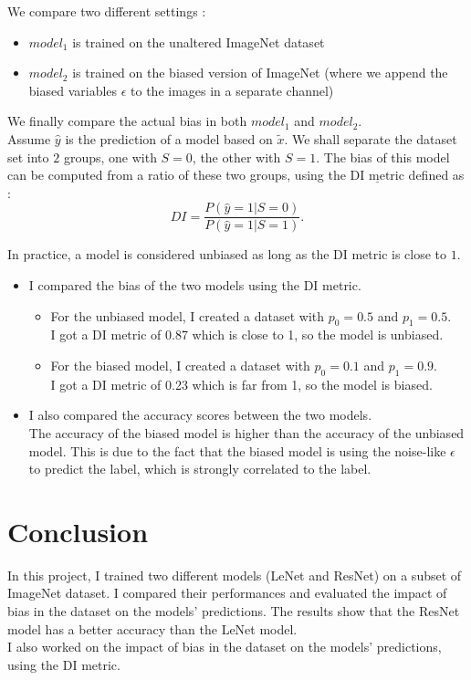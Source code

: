 \documentclass[12pt,a4paper]{article}
\begin{document}
We compare two different settings :
\begin{itemize}[label=--]
    \item $\textit{model}_1$ is trained on the unaltered ImageNet dataset
    \item $\textit{model}_2$ is trained on the biased version of ImageNet (where we append the biased variables $\epsilon$ to the images in a separate channel)
\end{itemize}


We finally compare the actual bias in both $\textit{model}_1$ and $\textit{model}_2$.\\

Assume $\hat{y}$ is the prediction of a model based on $\tilde{x}$.
We shall separate the dataset set into $2$ groups, one with $S = 0$, the other with $S = 1$.
The bias of this model can be computed from a ratio of these two groups, using the $\underline{\text{DI metric}}$ defined as :
$$
DI = \frac{P(\hat{y} = 1 | S = 0)}{P(\hat{y} = 1 | S = 1)}.
$$

In practice, a model is considered unbiased as long as the DI metric is close to $1$.


\begin{itemize}
    \item I compared the bias of the two models using the DI metric.
    \begin{itemize}[label=-]
        \item For the unbiased model, I created a dataset with $p_0 = 0.5$ and $p_1 = 0.5$. \\
        I got a DI metric of 0.87 which is close to 1, so the model is unbiased.

        \item For the biased model, I created a dataset with $p_0 = 0.1$ and $p_1 = 0.9$. \\
        I got a DI metric of 0.23 which is far from 1, so the model is biased.\\
    \end{itemize}

    \item I also compared the accuracy scores between the two models.\\
    The accuracy of the biased model is higher than the accuracy of the unbiased model.
    This is due to the fact that the biased model is using the noise-like $\epsilon$ to predict the label, which is strongly correlated to the label.
\end{itemize}


\section{Conclusion}

In this project, I trained two different models (LeNet and ResNet) on a subset of ImageNet dataset.
I compared their performances and evaluated the impact of bias in the dataset on the models' predictions.
The results show that the ResNet model has a better accuracy than the LeNet model.\\
I also worked on the impact of bias in the dataset on the models' predictions, using the DI metric.
\end{document}
